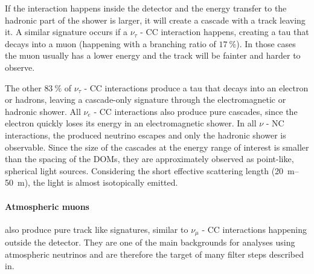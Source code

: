 If the interaction happens inside the detector and the energy transfer to the hadronic part of the shower is larger, it will create a cascade with a track leaving it. A similar signature occurs if a $\nu_\tau$ - CC interaction happens, creating a tau that decays into a muon (happening with a branching ratio of $\SI{17}{\percent}$). In those cases the muon usually has a lower energy and the track will be fainter and harder to observe.

The other $\SI{83}{\percent}$ of $\nu_\tau$ - CC interactions produce a tau that decays into an electron or hadrons, leaving a cascade-only signature through the electromagnetic or hadronic shower. All $\nu_e$ - CC interactions also produce pure cascades, since the electron quickly loses its energy in an electromagnetic shower. In all $\nu$ - NC interactions, the produced neutrino escapes and only the hadronic shower is observable. Since the size of the cascades at the energy range of interest is smaller than the spacing of the DOMs, they are approximately observed as point-like, spherical light sources. Considering the short effective scattering length (\SIrange[range-phrase=-]{20}{50}{\metre}), the light is almost isotopically emitted.


\paragraph{Atmospheric muons} also produce pure track like signatures, similar to $\nu_\mu$ - CC interactions happening outside the detector. They are one of the main backgrounds for analyses using atmospheric neutrinos and are therefore the target of many filter steps described in. 
